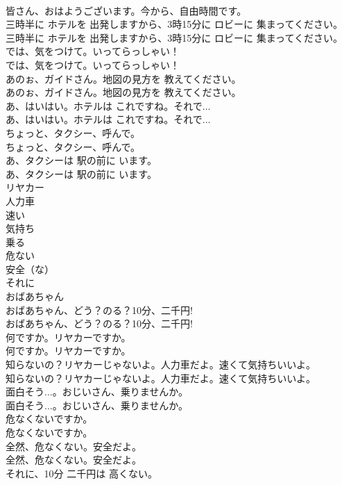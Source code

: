 \documentclass[8pt]{extreport}
\begin{document}
\begin{CJK}{UTF8}{min}
\\	皆さん、おはようございます。今から、自由時間です。 
\\	三時半に ホテルを 出発しますから、3時15分に ロビーに 集まってください。	
\\	三時半に ホテルを 出発しますから、3時15分に ロビーに 集まってください。 
\\	では、気をつけて。いってらっしゃい！	
\\	では、気をつけて。いってらっしゃい！ 
\\	あのぉ、ガイドさん。地図の見方を 教えてください。	
\\	あのぉ、ガイドさん。地図の見方を 教えてください。 
\\	あ、はいはい。ホテルは これですね。それで...	
\\	あ、はいはい。ホテルは これですね。それで... 
\\	ちょっと、タクシー、呼んで。	
\\	ちょっと、タクシー、呼んで。 
\\	あ、タクシーは 駅の前に います。	
\\	あ、タクシーは 駅の前に います。 
\\	リヤカー
\\	人力車
\\	速い
\\	気持ち
\\	乗る
\\	危ない
\\	安全（な）
\\	それに
\\	おばあちゃん
\\	おばあちゃん、どう？のる？10分、二千円!	
\\	おばあちゃん、どう？のる？10分、二千円! 
\\	何ですか。リヤカーですか。	
\\	何ですか。リヤカーですか。 
\\	知らないの？リヤカーじゃないよ。人力車だよ。速くて気持ちいいよ。	
\\	知らないの？リヤカーじゃないよ。人力車だよ。速くて気持ちいいよ。 
\\	面白そう...。おじいさん、乗りませんか。	
\\	面白そう...。おじいさん、乗りませんか。 
\\	危なくないですか。	
\\	危なくないですか。 
\\	全然、危なくない。安全だよ。	
\\	全然、危なくない。安全だよ。 
\\	それに、10分 二千円は 高くない。	

\end{CJK}
\end{document}
